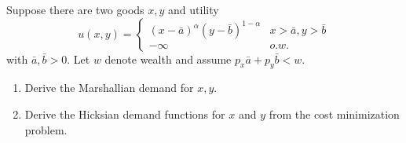 \documentclass[11pt]{article}
\begin{document}
Suppose there are two goods $x,y$ and utility \[
u(x,y) = \begin{cases}
     (x-\bar a)^\alpha (y-\bar b)^{1- \alpha} & x > \bar a, y > \bar b \\
     -\infty & o.w.
\end{cases}
\]
with $\bar a, \bar b > 0.$ Let $w$ denote wealth and assume $p_x \bar a + p_y \bar b < w$.  
\begin{enumerate}
    \item Derive the Marshallian demand for $x,y$. 
        
    
    \item Derive the Hicksian demand functions for $x$ and $y$ from the cost minimization problem. 
        

\end{enumerate}
\end{document}

